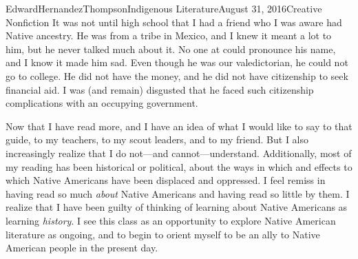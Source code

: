 \documentclass[12pt,letterpaper]{article}
\begin{document}
\begin{mla}{Edward}{Hernandez}{Thompson}{Indigenous Literature}{August 31, 2016}{Creative Nonfiction}
It was not until high school that I had a friend who I was aware had Native
ancestry. He was from a tribe in Mexico, and I knew it meant a lot to him, but
he never talked much about it. No one at could pronounce his name, and I know
it made him sad. Even though he was our valedictorian, he could not go to
college. He did not have the money, and he did not have citizenship to seek
financial aid. I was (and remain) disgusted that he faced such citizenship
complications with an occupying government.

Now that I have read more, and I have an idea of what I would like to say to
that guide, to my teachers, to my scout leaders, and to my friend. But I also
increasingly realize that I do not---and cannot---understand. Additionally,
most of my reading has been historical or political, about the ways in which
and effects to which Native Americans have been displaced and oppressed. I feel
remiss in having read so much \emph{about} Native Americans and having read so
little by them. I realize that I have been guilty of thinking of learning about
Native Americans as learning \emph{history}. I see this class as an opportunity
to explore Native American literature as ongoing, and to begin to orient myself
to be an ally to Native American people in the present day.

\clearpage
\printbibliography

\end{mla}
\end{document}

